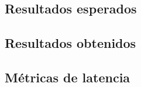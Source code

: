 
\subsection{Resultados esperados}

\subsection{Resultados obtenidos}

\subsection{Métricas de latencia}